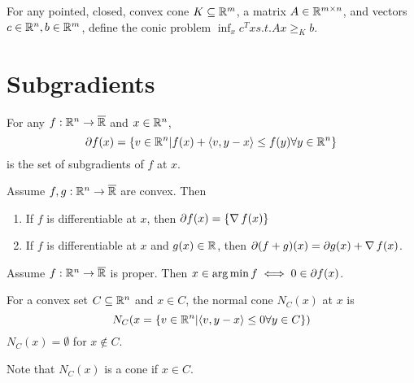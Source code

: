 \begin{defn}
  \label{sec:cones-gener-ineq-6}
  For any pointed, closed, convex cone $K \subseteq \mathbb{R}^{m}$, a matrix
  $A \in \mathbb{R}^{m \times n}$, and vectors $c \in \mathbb{R}^{n}, b \in \mathbb{R}^{m}$,
  define the conic problem $\inf_{x} c^{T} x s.t. Ax \geq_{K} b$.
\end{defn}

\section{Subgradients}
\label{sec:subgradients}

\begin{defn}
  \label{sec:subgradients-1}
  For any $f: \mathbb{R}^{n} \rightarrow \overline {\mathbb{R}}$ and $x \in \mathbb{R}^{n}$,
  \begin{equation}
    \label{eq:12}
    \partial f(x) = \{ v \in \R^{n} | f(x) + \IP{v, y -x} \leq f(y)
    \forall y \in \R^{n} \} 
  \end{equation} is the set of subgradients of $f$ at $x$. 
\end{defn}

\begin{thm}
  \label{sec:subgradients-3}
  Assume $f, g: \mathbb{R}^{n} \rightarrow \overline {\mathbb{R}}$ are convex.  Then
  \begin{enumerate}
  \item If $f$ is differentiable at $x$, then $\partial f(x) = \{
    \operatorname*{\nabla} f(x) \} $
  \item If $f$ is differentiable at $x$ and $g(x) \in \mathbb{R}$, then
    $\partial (f +g)(x) = \partial g(x) + \operatorname*{\nabla} f(x)$.
  \end{enumerate}
\end{thm}

\begin{thm}
  \label{sec:subgradients-4}
  Assume $f: \mathbb{R}^{n} \rightarrow \overline {\mathbb{R}}$ is proper.  Then $x \in
  \operatorname*{arg\,min} f \iff 0 \in \partial f(x)$.
\end{thm}

\begin{defn}
  \label{sec:subgradients-5}
  For a convex set $C \subseteq \mathbb{R}^{n}$ and $x \in C$, the normal cone
  $N_{C}(x)$ at $x$ is
  \begin{equation}
    \label{eq:13}
    N_{C}(x = \{ v \in \R^{n} | \IP{v, y -x } \leq 0 \forall y \in C \} )
  \end{equation}  $N_{C}(x) = \emptyset$ for $x \notin C$.

  Note that $N_{C}(x)$ is a cone if $x \in C$.
\end{defn}

